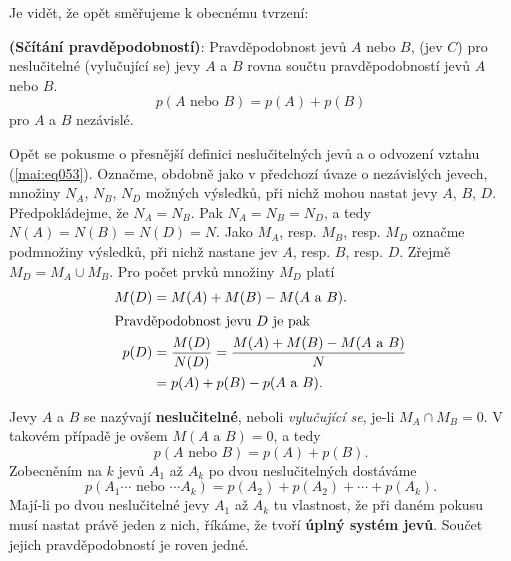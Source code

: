       
      
      Je vidět, že opět směřujeme k obecnému tvrzení:
      \begin{mdframed}[style=mdmathdef]
        \begin{lemma}\label{mai:lemma004}
          \textbf{(Sčítání pravděpodobností)}: Pravděpodobnost jevů \(A\) nebo \(B\),
          (jev \(C\)) pro neslučitelné (vylučující se) jevy \(A\) a \(B\) rovna součtu
          pravděpodobností jevů \(A\) nebo \(B\).
          \begin{equation}\label{mai:eq053}
            p(A \text{ nebo } B)= p(A) + p(B)
          \end{equation}
          pro \(A\) a \(B\) nezávislé.
        \end{lemma}
      \end{mdframed}
      
      Opět se pokusme o přesnější definici neslučitelných jevů a o odvození vztahu 
      (\ref{mai:eq053}). Označme, obdobně jako v předchozí úvaze o nezávislých jevech, množiny 
      \(N_A\), \(N_B\), \(N_D\) možných výsledků, při nichž mohou nastat jevy \(A\), \(B\), \(D\). 
      Předpokládejme, že \(N_A = N_B\). Pak \(N_A = N_B = N_D\), a tedy \(N(A) = N(B) = N(D) = N\). 
      Jako \(M_A\), resp. \(M_B\), resp. \(M_D\) označme podmnožiny výsledků, při nichž nastane jev 
      \(A\), resp. \(B\), resp. \(D\). Zřejmě \(M_D = M_A \cup M_B\). Pro počet prvků množiny 
      \(M_D\) platí 
      \begin{align*}
        M(D) &= M(A) + M(B) - M(A\text{ a }B).                                    \\
        \shortintertext{Pravděpodobnost jevu \(D\) je pak}
        p(D) &= \dfrac{M(D)}{N(D)} = \dfrac{M(A) + M(B) - M(A\text{ a }B)}{N}     \\
             &= p(A) + p(B) - p(A\text{ a }B).
      \end{align*}
      
      Jevy \(A\) a \(B\) se nazývají \textbf{neslučitelné}, neboli \emph{vylučující se}, je-li 
      \(M_A \cap M_B = 0\). V takovém případě je ovšem \(M(A\text{ a }B) = 0\), a tedy
      \begin{equation*}
        p(A\text{ nebo }B) = p(A) + p(B).
      \end{equation*}
      Zobecněním na \(k\) jevů \(A_1\) až \(A_k\) po dvou neslučitelných dostáváme
      \begin{equation*}
        p(A_1\cdots\text{ nebo }\cdots A_k) = p(A_2) + p(A_2) + \cdots + p(A_k).
      \end{equation*}
      Mají-li po dvou neslučitelné jevy \(A_1\) až \(A_k\) tu vlastnost, že při daném pokusu musí 
      nastat právě jeden z nich, říkáme, že tvoří \textbf{úplný systém jevů}. Součet jejich 
      pravděpodobností je roven jedné.
      
